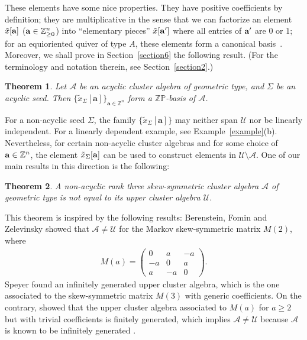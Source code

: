 \documentclass[pdftex]{sigma}
\numberwithin{equation}{section}
\newtheorem{Theorem}{Theorem}[section]
\begin{document}
These elements have some nice properties. They have positive coef\/f\/icients by def\/inition; they are multiplicative in the sense that we can factorize an element  $\tilde{x}[{\bf a}]$ (${\bf a}\in\mathbb{Z}_{\ge0}^n$) into ``elementary pieces''  $\tilde{x}[{\bf a}']$ where all entries of ${\bf a}'$ are $0$ or $1$;
for an equioriented quiver of type $A$, these elements form a canonical basis~\cite{B9}. Moreover, we shall prove in Section~\ref{section6} the following result. (For the terminology and notation therein, see Section~\ref{section2}.)

\begin{Theorem}\label{thm:basis}
Let $\mathcal{A}$ be an acyclic cluster algebra of geometric type, and $\Sigma$ be an acyclic seed. Then $\{\tilde{x}_\Sigma[\mathbf{a}]\}_{\mathbf{a}\in\mathbb{Z}^n}$  form a $\mathbb{ZP}$-basis of $\mathcal{A}$.
\end{Theorem}

For a non-acyclic seed $\Sigma$, the family $\{\tilde{x}_\Sigma[\mathbf{a}]\}$ may neither span $\mathcal{U}$ nor be linearly independent. For a linearly dependent example, see Example~\ref{example}(b). Nevertheless, for certain non-acyclic cluster algebras and for some choice of ${\bf a} \in \mathbb{Z}^n$, the element $\tilde{x}_\Sigma[{\bf a}]$ can be used to construct elements in $\mathcal{U}\setminus \mathcal{A}$. One of our main results in this direction is the following:

\begin{Theorem}\label{main-cor}
A non-acyclic rank three skew-symmetric cluster algebra $\mathcal{A}$ of geometric type is not equal to its upper cluster algebra $\mathcal{U}$.
\end{Theorem}

This theorem  is inspired by the following results: Berenstein, Fomin and Zelevinsky  \cite[Proposition 1.26]{BFZ} showed that $\mathcal{A}\neq \mathcal{U}$ for the Markov skew-symmetric matrix $M(2)$, where
\begin{gather*}
M(a)=\left(\begin{matrix}0 & a & -a\\ -a & 0 & a\\ a & -a & 0\end{matrix}\right).
\end{gather*}
Speyer \cite{S} found an inf\/initely generated upper cluster algebra, which is the one associated to the skew-symmetric matrix $M(3)$ with generic coef\/f\/icients. On the contrary, \cite[Proposition~6.2.2]{MM}  showed that the upper cluster algebra associated to $M(a)$ for $a\geq 2$ but with trivial coef\/f\/icients is f\/initely generated, which implies $\mathcal{A}\neq \mathcal{U}$ because $\mathcal{A}$ is known to be inf\/initely generated \cite[Theorem~1.24]{BFZ}.
\end{document}
